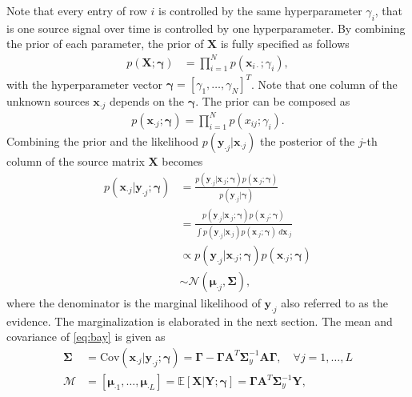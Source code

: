 Note that every entry of row $i$ is controlled by the same hyperparameter $\gamma_i$, that is one source signal over time is controlled by one hyperparameter. 
By combining the prior of each parameter, the prior of $\textbf{X}$ is fully specified as follows 
\begin{align*}
p (\mathbf{X} ; \boldsymbol{\gamma}) &= \prod_{i=1}^N p (\mathbf{x}_{i \cdot} ; \gamma_i),
\end{align*}
with the hyperparameter vector $\boldsymbol{\gamma} = [\gamma_1, \dots, \gamma_N]^T$. Note that one column of the unknown sources $\textbf{x}_{\cdot j}$ depends on the $\boldsymbol{\gamma}$. The prior can be composed as 
\begin{align*}
p\left(\textbf{x}_{\cdot j};\boldsymbol{\gamma}\right) = \prod_{i=1}^{N}p\left( x_{ij};\gamma_{i}\right).
\end{align*} 
Combining the prior and the likelihood $p(\mathbf{y}_{\cdot j} \vert \mathbf{x}_{\cdot j})$  the posterior of the $j$-th column of the source matrix $\mathbf{X}$ becomes
\begin{align}
p(\mathbf{x}_{\cdot j} \vert \mathbf{y}_{\cdot j} ; \boldsymbol{\gamma}) &= \frac{p(\mathbf{y}_{\cdot j} | \mathbf{x}_{\cdot j} ; \boldsymbol{\gamma}) p(\mathbf{x}_{\cdot j} ; \boldsymbol{\gamma})}{p(\mathbf{y}_{\cdot j} | \boldsymbol{\gamma})} \nonumber \\
&= \frac{p(\mathbf{y}_{\cdot j} | \mathbf{x}_{\cdot j} ; \boldsymbol{\gamma}) p(\mathbf{x}_{\cdot j} ; \boldsymbol{\gamma})}{\int p(\mathbf{y}_{\cdot j} | \mathbf{x}_{\cdot j}) p(\mathbf{x}_{\cdot j} ; \boldsymbol{\gamma}) \ d \mathbf{x}_{\cdot j}} \nonumber \\ 
&\propto p(\mathbf{y}_{\cdot j} | \mathbf{x}_{\cdot j} ; \boldsymbol{\gamma}) p(\mathbf{x}_{\cdot j} ; \boldsymbol{\gamma})\\
&\sim \mathcal{N}(\boldsymbol{\mu}_{\cdot j}, \boldsymbol{\Sigma}),\label{eq:bay}
\end{align}
where the denominator is the marginal likelihood of $\mathbf{y}_{\cdot j}$ also referred to as the evidence. The marginalization is elaborated in the next section. The mean and covariance of \eqref{eq:bay} is given as
\begin{align}
\boldsymbol{\Sigma} &= \text{Cov}(\mathbf{x}_{\cdot j} \vert \mathbf{y}_{\cdot j} ; \boldsymbol{\gamma}) = \boldsymbol{\Gamma} - \boldsymbol{\Gamma} \mathbf{A}^T \boldsymbol{\Sigma}_y^{-1} \mathbf{A} \boldsymbol{\Gamma}, \quad \forall j = 1, \dots, L \label{eq:moments1} \\
\mathcal{M} &= [\boldsymbol{\mu}_{\cdot 1}, \dots, \boldsymbol{\mu}_{\cdot L}] = \mathbb{E}[\mathbf{X} \vert \mathbf{Y} ; \boldsymbol{\gamma}] = \boldsymbol{\Gamma} \mathbf{A}^T \boldsymbol{\Sigma}_y^{-1} \mathbf{Y}, \label{eq:moments2} 
\end{align}
